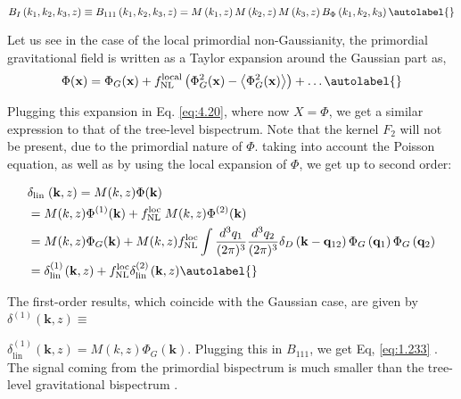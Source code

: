 \begin{equation}
    B_{I}\left(k_{1}, k_{2}, k_{3}, z\right) \equiv B_{111}\left(k_{1}, k_{2}, k_{3}, z\right)=M\left(k_{1}, z\right) M\left(k_{2}, z\right) M\left(k_{3}, z\right) B_{\Phi}\left(k_{1}, k_{2}, k_{3}\right) \autolabel{}
\end{equation}

 
Let us see in the case of the local primordial non-Gaussianity, the primordial gravitational field is written as a Taylor expansion around the Gaussian part as, 
\begin{equation}
    \Phi(\mathbf{x})=\Phi_{G}(\mathbf{x})+f_{\mathrm{NL}}^{\mathrm{local}}\left(\Phi_{G}^{2}(\mathbf{x})-\left\langle\Phi_{G}^{2}(\mathbf{x})\right\rangle\right)+\ldots \autolabel{}
\end{equation}


Plugging this expansion in Eq. \eqref{eq:4.20}, where now $X=\Phi$, we get a similar expression to that of the tree-level bispectrum. Note that the kernel $F_{2}$ will not be present, due to the primordial nature of $\Phi$. taking into account the Poisson equation, as well as by using the local expansion of $\Phi$, we get up to second order:


\begin{align*}
    & \delta_{\text {lin }}(\mathbf{k}, z)=M(k, z) \Phi(\mathbf{k}) \\
    & =M(k, z) \Phi^{(1)}(\mathbf{k})+f_{\mathrm{NL}}^{\text {loc }} M(k, z) \Phi^{(2)}(\mathbf{k}) \\
    & =M(k, z) \Phi_{G}(\mathbf{k})+M(k, z) f_{\mathrm{NL}}^{\mathrm{loc}} \int \frac{d^{3} q_{1}}{(2 \pi)^{3}} \frac{d^{3} q_{2}}{(2 \pi)^{3}} \delta_{D}\left(\mathbf{k}-\mathbf{q}_{12}\right) \Phi_{G}\left(\mathbf{q}_{1}\right) \Phi_{G}\left(\mathbf{q}_{2}\right) \\
    & =\delta_{\text {lin }}^{(1)}(\mathbf{k}, z)+f_{\mathrm{NL}}^{\mathrm{loc}} \delta_{\text {lin }}^{(2)}(\mathbf{k}, z) \autolabel{}
\end{align*}


The first-order results, which coincide with the Gaussian case, are given by $\delta^{(1)}(\mathbf{k}, z) \equiv$

$\delta_{\text {lin }}^{(1)}(\mathbf{k}, z)=M(k, z) \Phi_{G}(\mathbf{k})$. Plugging this in $B_{111}$, we get Eq, \eqref{eq:1.233} \cite{creminelli2006JCAP...05..004C}. The signal coming from the primordial bispectrum is much smaller than the tree-level gravitational bispectrum \cite{Sefusatti_2007}.

